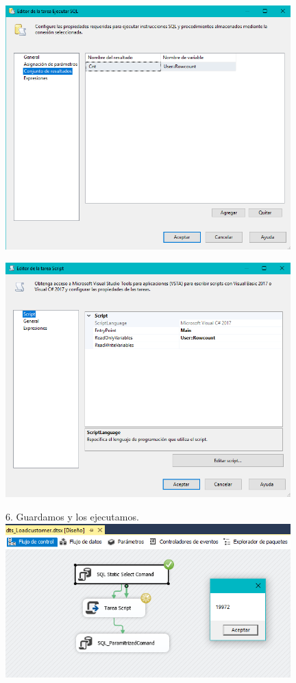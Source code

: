	\begin{center}
	\includegraphics[width=11cm]{./Imagenes/img25}
	\end{center}	
	\begin{center}
	\includegraphics[width=11cm]{./Imagenes/img26}
	\end{center}	
	\begin{center}

6. Guardamos y los ejecutamos.\\
	\includegraphics[width=11cm]{./Imagenes/img27}
	\end{center}	